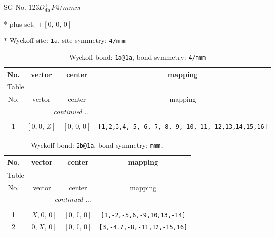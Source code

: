 \documentclass[fleqn,8pt]{jsarticle}
\begin{document}
\setcounter{MaxMatrixCols}{32}

\renewcommand{\tablename}{Table~}
\renewcommand{\figurename}{Figure~}
\begin{center}
\LARGE
SG No. 123\quad$D_{\rm 4h}^{1}$\quad$P4/mmm$\quad[ tetragonal ]
\end{center}

* plus set:\,\,\,$+\left[ 0,\, 0,\, 0 \right]$


* Wyckoff site: {\tt 1a}, site symmetry: {\tt 4/mmm}
\renewcommand{\arraystretch}{1.2}
\begin{longtable}{cccc}
\caption{Wyckoff bond: {\tt 1a@1a}, bond symmetry: {\tt 4/mmm}}
 \\
 \hline \hline
No. & vector & center & mapping \\ \hline \endfirsthead

\multicolumn{3}{l}{\tablename\ \thetable{}} \\
 \hline \hline
No. & vector & center & mapping \\ \hline \endhead

 \hline \hline
\multicolumn{3}{r}{\footnotesize\it continued ...} \\ \endfoot

 \hline \hline
\multicolumn{3}{r}{} \\ \endlastfoot

1 & $\left[ 0,\, 0,\, Z \right]$ & $\left[ 0,\, 0,\, 0 \right]$ & {\tt [1,2,3,4,-5,-6,-7,-8,-9,-10,-11,-12,13,14,15,16]} \\
\end{longtable}
\renewcommand{\arraystretch}{1.2}
\begin{longtable}{cccc}
\caption{Wyckoff bond: {\tt 2b@1a}, bond symmetry: {\tt mmm.}}
 \\
 \hline \hline
No. & vector & center & mapping \\ \hline \endfirsthead

\multicolumn{3}{l}{\tablename\ \thetable{}} \\
 \hline \hline
No. & vector & center & mapping \\ \hline \endhead

 \hline \hline
\multicolumn{3}{r}{\footnotesize\it continued ...} \\ \endfoot

 \hline \hline
\multicolumn{3}{r}{} \\ \endlastfoot

1 & $\left[ X,\, 0,\, 0 \right]$ & $\left[ 0,\, 0,\, 0 \right]$ & {\tt [1,-2,-5,6,-9,10,13,-14]} \\ \hline
2 & $\left[ 0,\, X,\, 0 \right]$ & $\left[ 0,\, 0,\, 0 \right]$ & {\tt [3,-4,7,-8,-11,12,-15,16]} \\
\end{longtable}
\end{document}
